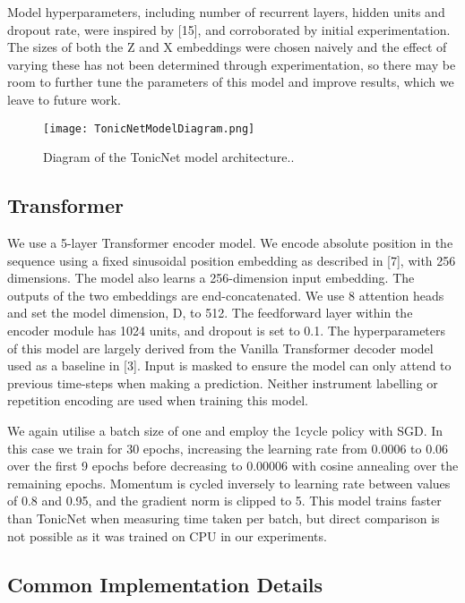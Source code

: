 \documentclass{article}
\begin{document}
Model hyperparameters, including number of recurrent layers, hidden units and dropout rate, were inspired by [15], and corroborated by initial experimentation. The sizes of both the Z and X embeddings were chosen naively and the effect of varying these has not been determined through experimentation, so there may be room to further tune the parameters of this model and improve results, which we leave to future work.

\begin{figure}
 \centerline{
 \texttt{[image: TonicNetModelDiagram.png]}}
 \caption{Diagram of the TonicNet model architecture..}
 \label{fig:tonicnetarch}
\end{figure}

\subsection{Transformer}\label{subsec:transformer}

We use a 5-layer Transformer encoder model. We encode absolute position in the sequence using a fixed sinusoidal position embedding as described in [7], with 256 dimensions. The model also learns a 256-dimension input embedding. The outputs of the two embeddings are end-concatenated. We use 8 attention heads and set the model dimension, D, to 512. The feedforward layer within the encoder module has 1024 units, and dropout is set to 0.1. The hyperparameters of this model are largely derived from the Vanilla Transformer decoder model used as a baseline in [3]. Input is masked to ensure the model can only attend to previous time-steps when making a prediction. Neither instrument labelling or repetition encoding are used when training this model.

We again utilise a batch size of one and employ the 1cycle policy with SGD. In this case we train for 30 epochs, increasing the learning rate from 0.0006 to 0.06 over the first 9 epochs before decreasing to 0.00006 with cosine annealing over the remaining epochs. Momentum is cycled inversely to learning rate between values of 0.8 and 0.95, and the gradient norm is clipped to 5. This model trains faster than TonicNet when measuring time taken per batch, but direct comparison is not possible as it was trained on CPU in our experiments.

\subsection{Common Implementation Details}\label{subsec:com_imp}
\end{document}

